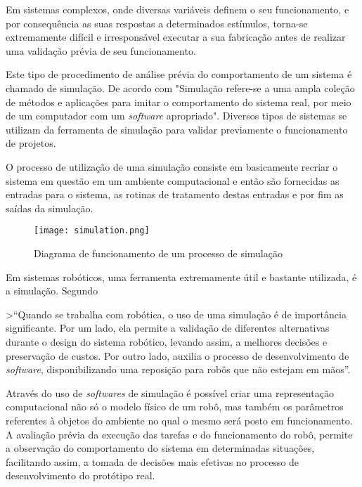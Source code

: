 Em sistemas complexos, onde diversas variáveis definem o seu funcionamento, e por consequência as suas respostas a determinados estímulos, torna-se extremamente difícil e irresponsável executar a sua fabricação antes de realizar uma validação prévia de seu funcionamento.

Este tipo de procedimento de análise prévia do comportamento de um sistema é chamado de simulação. De acordo com \cite{definicao_de_simulacao} "Simulação refere-se a uma ampla coleção de métodos e aplicações para imitar o comportamento do sistema real, por meio de um computador com um \textit{software} apropriado". Diversos tipos de sistemas se utilizam da ferramenta de simulação para validar previamente o funcionamento de projetos.

O processo de utilização de uma simulação consiste em basicamente recriar o sistema em questão em um ambiente computacional e então são fornecidas as entradas para o sistema, as rotinas de tratamento destas entradas e por fim as saídas da simulação.

\begin{figure}[h!]												
	\centering												
	\texttt{[image: simulation.png]}			
	\caption{Diagrama de funcionamento de um processo de simulação}		
	\label{img:simulation}	
\end{figure}


Em sistemas robóticos, uma ferramenta extremamente útil e bastante utilizada, é a simulação. Segundo \cite{artigo_sobre_simulacao} 

>“Quando se trabalha com robótica, o uso de uma simulação é de importância significante. Por um lado, ela permite a validação de diferentes alternativas durante o design do sistema robótico, levando assim, a melhores decisões e preservação de custos. Por outro lado, auxilia o processo de desenvolvimento de \textit{software}, disponibilizando uma reposição para robôs que não estejam em mãos”.

Através do uso de \textit{softwares} de simulação é possível criar uma representação computacional não só o modelo físico de um robô, mas também os parâmetros referentes à objetos do ambiente no qual o mesmo será posto em funcionamento. A avaliação prévia da execução das tarefas e do funcionamento do robô, permite a observação do comportamento do sistema em determinadas situações, facilitando assim, a tomada de decisões mais efetivas no processo de desenvolvimento do protótipo real. 

